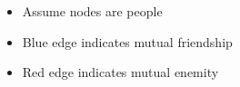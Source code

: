 \documentclass[preview]{standalone}
\begin{document}
\begin{center}
\begin{itemize} \item Assume nodes are people \\ \item Blue edge indicates mutual friendship \\ \item Red edge indicates mutual enemity \end{itemize}
\end{center}
\end{document}
